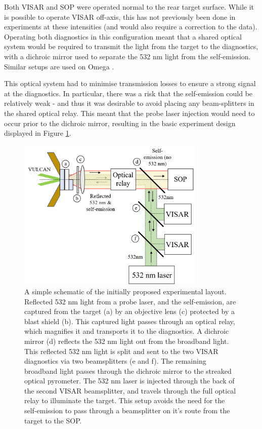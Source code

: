 Both VISAR and SOP were operated normal to the rear target surface. While it is possible to operate VISAR off-axis, this has not previously been done in experiments at these intensities (and would also require a correction to the data). Operating both diagnostics in this configuration meant that a shared optical system would be required to transmit the light from the target to the diagnostics, with a dichroic mirror used to separate the 532 nm light from the self-emission. Similar setups are used on Omega \cite{Miller2007, Gregor2016}.

This optical system had to minimise transmission losses to ensure a strong signal at the diagnostics. In particular, there was a risk that the self-emission could be relatively weak - and thus it was desirable to avoid placing any beam-splitters in the shared optical relay. This meant that the probe laser injection would need to occur prior to the dichroic mirror, resulting in the basic experiment design displayed in Figure \ref{fig:Simple experiment schematic}.

\begin{figure}
  \centering
\includegraphics[width=0.8\textwidth]{figures/Experiment/Simple experiment schematic.png}%
\caption{\label{fig:Simple experiment schematic} A simple schematic of the initially proposed experimental layout. Reflected 532 nm light from a probe laser, and the self-emission, are captured from the target (a) by an objective lens (c) protected by a blast shield (b). This captured light passes through an optical relay, which magnifies it and transports it to the diagnostics. A dichroic mirror (d) reflects the 532 nm light out from the broadband light. This reflected 532 nm light is split and sent to the two VISAR diagnostics via two beamsplitters (e and f). The remaining broadband light passes through the dichroic mirror to the streaked optical pyrometer. The 532 nm laser is injected through the back of the second VISAR beamsplitter, and travels through the full optical relay to illuminate the target. This setup avoids the need for the self-emission to pass through a beamsplitter on it's route from the target to the SOP.  }
\end{figure}

